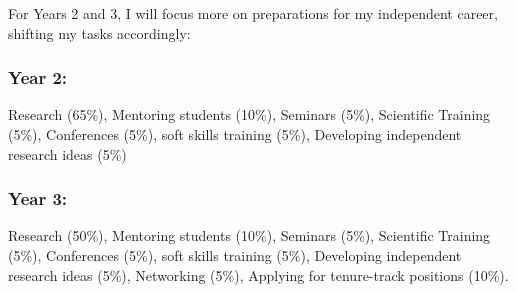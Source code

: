 \documentclass[11pt]{article}
\begin{document}
For Years 2 and 3, I will focus more on preparations for my independent career, shifting my tasks accordingly:

\subsubsection*{Year 2:}
Research (65\%), Mentoring students (10\%), Seminars (5\%), Scientific Training (5\%), Conferences (5\%), soft skills training (5\%), Developing independent research ideas (5\%)

\subsubsection*{Year 3:}
Research (50\%), Mentoring students (10\%), Seminars (5\%), Scientific Training (5\%), Conferences (5\%), soft skills training (5\%), Developing independent research ideas (5\%), Networking (5\%), Applying for tenure-track positions (10\%).
\end{document}
